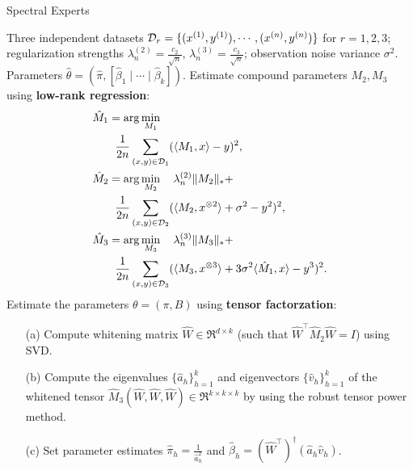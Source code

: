 \begin{algorithm}[t]
  \caption{Spectral Experts}
  \label{algo:spectral-experts}
  \begin{algorithmic}[1]
    \INPUT Three independent datasets $\mathcal{D}_r = \{ (x^{(1)}, y^{(1)}), \cdots, (x^{(n)}, y^{(n)}) \}$ for $r = 1, 2, 3$;
    regularization strengths $\lambda_n^{(2)} = \frac{c_2}{\sqrt{n}}$, $\lambda_n^{(3)} = \frac{c_3}{\sqrt{n}}$;
    observation noise variance $\sigma^2$.
    \OUTPUT Parameters $\hat\theta = (\hat \pi, [\hat \beta_1 \mid \cdots \mid \hat \beta_k])$.
    \STATE Estimate compound parameters $M_2, M_3$ using \textbf{low-rank regression}:
    \begin{align}
      &\hat M_1 = \arg\min_{M_1} \label{eqn:estimateM1} \\
      &\quad\quad\frac{1}{2n} \sum_{(x,y) \in \mathcal{D}_1} (\langle M_1, x \rangle - y)^2, \nonumber \\
      &\hat M_2 = \arg\min_{M_2} \quad \lambda_n^{(2)} \|M_2\|_* + \label{eqn:estimateM2} \\
      &\quad\quad\frac{1}{2n} \sum_{(x,y) \in \mathcal{D}_2} (\langle M_2, x^{\otimes 2} \rangle + \sigma^2 - y^2)^2, \nonumber \\
      &\hat M_3 = \arg\min_{M_3} \quad \lambda_n^{(3)} \|M_3\|_* + \label{eqn:estimateM3} \\
      &\quad\quad\frac{1}{2n} \sum_{(x,y) \in \mathcal{D}_3} (\langle M_3, x^{\otimes 3} \rangle + 3 \sigma^2\langle \hat M_1, x \rangle - y^3)^2. \nonumber
    \end{align}
    \STATE Estimate the parameters $\theta = (\pi, B)$ using \textbf{tensor factorzation}:
    \begin{enumerate}
      \item [(a)] Compute whitening matrix $\hat W \in \Re^{d \times k}$ (such that $\hat W^\top
      \hat M_2 \hat W = I$) using SVD.
      \item [(b)] Compute the eigenvalues $\{\hat a_h\}_{h=1}^k$
      and eigenvectors $\{\hat v_h\}_{h=1}^k$
      of the whitened tensor $\hat M_3(\hat W, \hat W, \hat W) \in \Re^{k \times k \times k}$
      by using the robust tensor power method.
    \item [(c)] Set parameter estimates $\hat\pi_h = \frac{1}{\hat a_h^2}$
    and $\hat\beta_h = (\hat W^{\top})^\dagger (\hat a_h \hat v_h)$.
    \end{enumerate}
  \end{algorithmic}
\end{algorithm}


